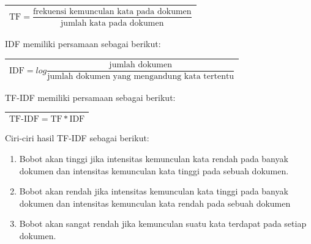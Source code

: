 \begin{table}[H]
	\small
	\begin{adjustbox}{width=1\textwidth}
	\begin{tabular}{|p{13.55cm}|}
		\hline
		\begin{equation} \label{eqn:TF}
				\textrm{TF}=\frac{\textrm{frekuensi kemunculan kata pada dokumen}}{\textrm{jumlah kata pada dokumen}}
		\end{equation}\\
		\hline
	\end{tabular}
	\end{adjustbox}
\end{table}
\noindent IDF memiliki persamaan sebagai berikut:	
\begin{table}[H]
	\small
	\begin{adjustbox}{width=1\textwidth}
	\begin{tabular}{|p{13.55cm}|}
		\hline
		\begin{equation} \label{eqn:IDF}
		\textrm{IDF}=log\frac{\textrm{jumlah dokumen}}{\textrm{jumlah dokumen yang mengandung kata tertentu}}
		\end{equation}\\
		\hline
	\end{tabular}
	\end{adjustbox}
\end{table}
\noindent TF-IDF memiliki persamaan sebagai berikut:
\begin{table}[H]
	\small
	\begin{adjustbox}{width=1\textwidth}
	\begin{tabular}{|p{13.55cm}|}
		\hline
		\begin{equation} \label{eqn:TF-IDF}
		\textrm{TF-IDF}=\textrm{TF}*\textrm{IDF}
		\end{equation}\\
		\hline
	\end{tabular}
	\end{adjustbox}
\end{table}	
\noindent Ciri-ciri hasil TF-IDF sebagai berikut:
\begin{enumerate}[leftmargin=*]
	\item Bobot akan tinggi jika intensitas kemunculan kata rendah pada banyak dokumen dan intensitas kemunculan kata tinggi pada sebuah dokumen.
	\item Bobot akan rendah jika intensitas kemunculan kata tinggi pada banyak dokumen dan intensitas kemunculan kata rendah pada sebuah dokumen
	\item Bobot akan sangat rendah jika kemunculan suatu kata terdapat pada setiap dokumen.
\end{enumerate}
	
